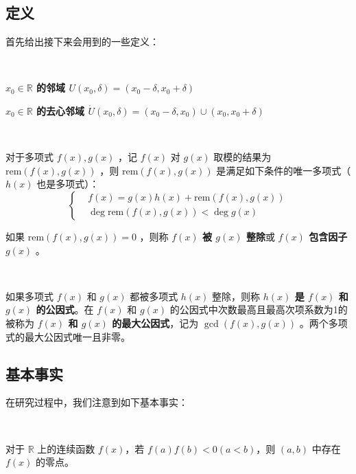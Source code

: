 \subsection{定义}

首先给出接下来会用到的一些定义：

\begin{definition}[邻域]~

	\textbf{$x_0 \in \mathbb{R}$ 的邻域 $U(x_0, \delta) = (x_0 - \delta, x_0 + \delta)$} 
	
	\textbf{$x_0 \in \mathbb{R}$ 的去心邻域 $\mathring{U}(x_0, \delta) = (x_0 - \delta, x_0) \cup (x_0, x_0 + \delta)$}
	
\end{definition}

\begin{definition}[多项式的取模与整除]~

	对于多项式 $f(x), g(x)$ ，记 $f(x)$ 对 $g(x)$ 取模的结果为 $\textrm{rem}(f(x), g(x))$ ，则 $\textrm{rem}(f(x), g(x))$ 是满足如下条件的唯一多项式（ $h(x)$ 也是多项式）：
	$$
	\left\{
	\begin{aligned}
		& f(x) = g(x)h(x) + \textrm{rem}(f(x), g(x)) \\
		& \deg \textrm{rem}(f(x), g(x)) < \deg g(x)
	\end{aligned}
	\right.
	$$
	
	如果 $\textrm{rem}(f(x), g(x)) = 0$ ，则称\textbf{ $f(x)$ 被 $g(x)$ 整除}或\textbf{ $f(x)$ 包含因子 $g(x)$ }。
	
\end{definition}

\begin{definition}[多项式的最大公因式]~
	
	如果多项式 $f(x)$ 和 $g(x)$ 都被多项式 $h(x)$ 整除，则称\textbf{ $h(x)$ 是 $f(x)$ 和 $g(x)$ 的公因式}。在 $f(x)$ 和 $g(x)$ 的公因式中次数最高且最高次项系数为1的被称为\textbf{ $f(x)$ 和 $g(x)$ 的最大公因式}，记为 $\gcd(f(x), g(x))$ 。两个多项式的最大公因式唯一且非零。
	
\end{definition}

\subsection{基本事实}

在研究过程中，我们注意到如下基本事实：

\begin{fact}[介值定理]~
	
	对于 $\mathbb{R}$ 上的连续函数 $f(x)$，若 $f(a)f(b) < 0(a < b)$，则 $(a, b)$ 中存在 $f(x)$ 的零点。
	
\end{fact}

